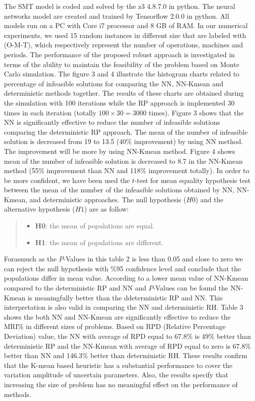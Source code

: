 \documentclass[letterpaper]{article} %
\begin{document}
The SMT model is coded and solved by the z3 4.8.7.0 in python. The neural networks model are created and trained by Tensorflow 2.0.0 in python. All models run on a PC with Core i7 processor and 8 GB of RAM. In our numerical experiments, we used 15 random instances in different size that are labeled with (O-M-T), which respectively represent the number of operations, machines and periods. The performance of the proposed robust approach is investigated in terms of the ability to maintain the feasibility of the problem based on Monte Carlo simulation.
The figure 3 and 4 illustrate the histogram charts related to percentage of infeasible solutions for comparing the NN, NN-Kmean and deterministic methods together. The results of these charts are obtained during the simulation with 100 iterations while the RP approach is implemented 30 times in each iteration (totally $100\times 30=3000$ times).
Figure 3 shows that the NN is significantly effective to reduce the number of infeasible solutions comparing the deterministic RP approach. The mean of the number of infeasible solution is decreased from 19 to 13.5 (40\% improvement) by using NN method. The improvement will be more by using NN-Kmean method. Figure 4 shows mean of the number of infeasible solution is decreased to 8.7 in the NN-Kmean method (55\% improvement than NN and 118\% improvement totally).
In order to be more confident, we have been used the $t$-test for mean equality hypothesis test between the mean of the number of the infeasible solutions obtained by NN, NN-Kmean, and deterministic approaches. The null hypothesis ($H0$) and the alternative hypothesis ($H1$) are as follow:
\begin{quote}
\begin{itemize}
\item \textbf{H0}: the mean of populations are equal.
\item \textbf{H1}: the mean of populations are different.
\end{itemize}
\end{quote}
Forasmuch as the $P$-Values in this table 2 is less than 0.05 and close to zero we can reject the null hypothesis with \%95 confidence level and conclude that the populations differ in mean value. According to a lower mean value of NN-Kmean compared to the deterministic RP and NN and $P$-Values can be found the NN-Kmean is meaningfully better than the ddeterministic RP and NN. This interpretation is also valid in comparing the NN and deterministic RH.
Table 3 shows the both NN and NN-Kmean are significantly effective to reduce the MRI\% in different sizes of problems. Based on RPD (Relative Percentage Deviation) value, the NN with average of RPD equal to 67.8\% is 49\% better than deterministic RP and the NN-Kmean with average of RPD equal to zero is 67.8\% better than NN and 146.3\% better than deterministic RH. These results confirm that the K-mean based heuristic has a substantial performance to cover the variation amplitude of uncertain parameters. Also, the results specify that increasing the size of problem has no meaningful effect on the performance of methods. 
\end{document}
